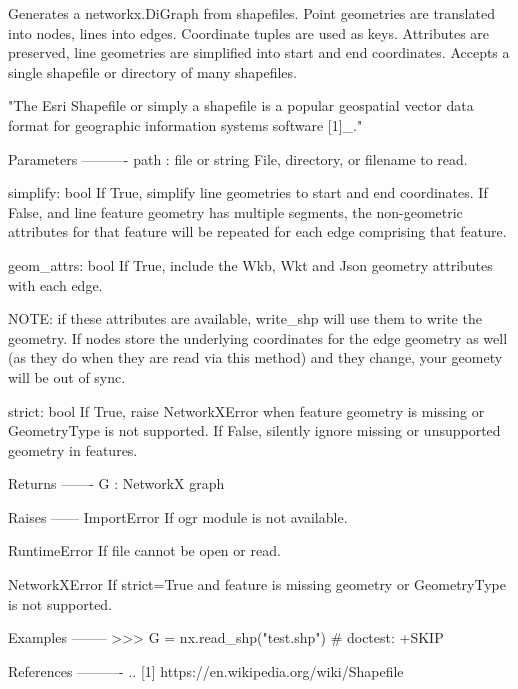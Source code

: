 \begin{DoxyVerb}Generates a networkx.DiGraph from shapefiles. Point geometries are
translated into nodes, lines into edges. Coordinate tuples are used as
keys. Attributes are preserved, line geometries are simplified into start
and end coordinates. Accepts a single shapefile or directory of many
shapefiles.

"The Esri Shapefile or simply a shapefile is a popular geospatial vector
data format for geographic information systems software [1]_."

Parameters
----------
path : file or string
   File, directory, or filename to read.

simplify:  bool
    If True, simplify line geometries to start and end coordinates.
    If False, and line feature geometry has multiple segments, the
    non-geometric attributes for that feature will be repeated for each
    edge comprising that feature.

geom_attrs: bool
    If True, include the Wkb, Wkt and Json geometry attributes with
    each edge.

    NOTE:  if these attributes are available, write_shp will use them
    to write the geometry.  If nodes store the underlying coordinates for
    the edge geometry as well (as they do when they are read via
    this method) and they change, your geomety will be out of sync.

strict: bool
    If True, raise NetworkXError when feature geometry is missing or
    GeometryType is not supported.
    If False, silently ignore missing or unsupported geometry in features.

Returns
-------
G : NetworkX graph

Raises
------
ImportError
   If ogr module is not available.

RuntimeError
   If file cannot be open or read.

NetworkXError
   If strict=True and feature is missing geometry or GeometryType is
   not supported.

Examples
--------
>>> G = nx.read_shp("test.shp")  # doctest: +SKIP

References
----------
.. [1] https://en.wikipedia.org/wiki/Shapefile
\end{DoxyVerb}
 \mbox{\label{namespacenetworkx_1_1readwrite_1_1nx__shp_a435be46a19405134a855f8dd70df49b3}} 
